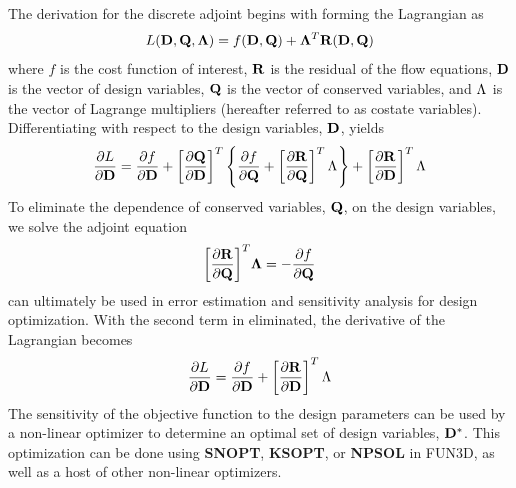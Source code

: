 The derivation for the discrete adjoint begins with forming the Lagrangian as
\begin{equation}
  L(\mathbf D,\mathbf Q,\mathbf{\Lambda})=f(\mathbf D,\mathbf Q)
  +\mathbf{\Lambda}^T\mathbf R(\mathbf D,\mathbf Q)
  \label{lagrangian}
\end{equation}
where $f$ is the cost function of interest, $\mathbf R$ is the residual of the flow
equations, $\mathbf D$ is the vector of design variables, $\mathbf Q$ is the vector of
conserved variables, and $\Lambda_{}$ is the vector of Lagrange multipliers
(hereafter referred to as costate variables).  Differentiating with respect to
the design variables, $\mathbf D$, yields
\begin{equation}
  \frac{\partial L}{\partial \mathbf D} = 
  \frac{\partial f}{\partial \mathbf D} + \left[ \frac{\partial \mathbf Q}{\partial \mathbf D} \right]^T \left\{ 
    \frac{\partial f}{\partial \mathbf Q} + \left[ \frac{\partial \mathbf R_{}}{\partial \mathbf Q} \right]^T \Lambda_{}
  \right\}
  + \left[ \frac{\partial \mathbf R_{}}{\partial \mathbf D} \right]^T \Lambda_{}
  \label{dL}
\end{equation}
To eliminate the dependence of conserved variables, $\mathbf Q$, on the design
variables, we solve the adjoint equation
\begin{equation}
  \bigg[\frac{\partial \mathbf R}{\partial \mathbf Q}\bigg]^T\mathbf{\Lambda} = -\frac{\partial f}{\partial \mathbf Q}
  \label{adjoint-main}
\end{equation}
 can ultimately be used in error estimation and sensitivity analysis
for design optimization.  With the second term in  eliminated, the
derivative of the Lagrangian becomes
\begin{equation}
  \frac{\partial L}{\partial \mathbf D}=
  \frac{\partial f}{\partial \mathbf D} + \left[ \frac{\partial \mathbf R_{}}{\partial \mathbf D} \right]^T \Lambda_{}
  \label{obj-function}
\end{equation}
The sensitivity of the objective function to the design parameters can be used
by a non-linear optimizer to determine an optimal set of design variables,
$\mathbf D^*$. This optimization can be done using {\bf SNOPT\cite{snopt-manual}},
{\bf KSOPT\cite{KSOPT}}, or {\bf NPSOL\cite{npsol-manual}} in FUN3D, as well as
a host of other non-linear optimizers.


